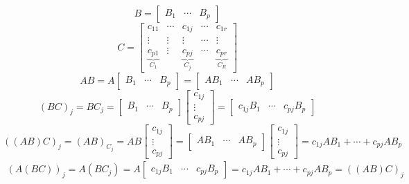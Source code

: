 \documentclass[]{article}
\begin{document}
\[B = \left[ {\begin{array}{*{20}{c}}
	{{B_1}}& \cdots &{B{_p}}
	\end{array}} \right]\]
\[C = \left[ {\begin{array}{*{20}{c}}
	{{c_{11}}}& \cdots &{{c_{1j}}}& \cdots &{{c_{1r}}}\\
	\vdots & \vdots & \vdots & \cdots & \vdots \\
	{\underbrace {{c_{p1}}}_{{C_1}}}& \vdots &{\underbrace {{c_{pj}}}_{{C_j}}}& \cdots &{\underbrace {{c_{pr}}}_{{C_R}}}
	\end{array}} \right]\]
\[AB = A\left[ {\begin{array}{*{20}{c}}
	{{B_1}}& \cdots &{B{_p}}
	\end{array}} \right] = \left[ {\begin{array}{*{20}{c}}
	{A{B_1}}& \cdots &{AB{_p}}
	\end{array}} \right]\]
\[{\left( {BC} \right)_j} = B{C_j} = \left[ {\begin{array}{*{20}{c}}
	{{B_1}}& \cdots &{B{_p}}
	\end{array}} \right]\left[ {\begin{array}{*{20}{c}}
	{{c_{1j}}}\\
	\vdots \\
	{{c_{pj}}}
	\end{array}} \right] = \left[ {\begin{array}{*{20}{c}}
	{{c_{1j}}{B_1}}& \cdots &{{c_{pj}}B{_p}}
	\end{array}} \right]\]
\[{\left( {\left( {AB} \right)C} \right)_j} = {\left( {AB} \right)_{{C_j}}} = AB\left[ {\begin{array}{*{20}{c}}
	{{c_{1j}}}\\
	\vdots \\
	{{c_{pj}}}
	\end{array}} \right] = \left[ {\begin{array}{*{20}{c}}
	{A{B_1}}& \cdots &{AB{_p}}
	\end{array}} \right]\left[ {\begin{array}{*{20}{c}}
	{{c_{1j}}}\\
	\vdots \\
	{{c_{pj}}}
	\end{array}} \right] = {c_{1j}}A{B_1} +  \cdots  + {c_{pj}}A{B_p}\]
\[\begin{array}{l}
{ \boxed{\left({A\left( {BC} \right)} \right)_j}} = A\left( {B{C_j}} \right) = A\left[ {\begin{array}{*{20}{c}}
	{{c_{1j}}{B_1}}& \cdots &{{c_{pj}}B{_p}}
	\end{array}} \right] = {c_{1j}}A{B_1} +  \cdots  + {c_{pj}}A{B_p} \boxed{= ((AB)C)_j}\\

\end{array}\]
\end{document}
